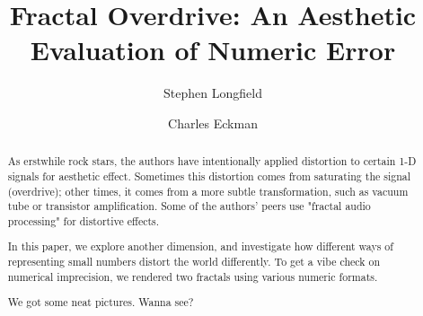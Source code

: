 \documentclass[sigconf,authorversion,nonacm]{acmart}
\begin{document}
\title{%
    Fractal Overdrive: An Aesthetic Evaluation of Numeric Error
}

\author{Stephen Longfield}

\author{Charles Eckman}

\renewcommand{\shortauthors}{Longfield and Eckman}

\begin{abstract}

As erstwhile rock stars, the authors have intentionally applied distortion to certain 1-D signals for aesthetic effect.
Sometimes this distortion comes from saturating the signal (overdrive); other times, it comes from a more subtle
transformation, such as vacuum tube or transistor amplification. Some of the authors' peers use "fractal audio processing"
\cite{fractal-audio} for distortive effects.

In this paper, we explore another dimension, and investigate how different ways of representing small numbers distort the world differently. To get a vibe check on numerical imprecision, we rendered two fractals using various numeric formats.

We got some neat pictures. Wanna see?


\end{abstract}
\end{document}
